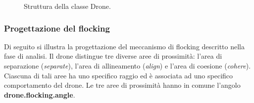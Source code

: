 \begin{figure}[H] 
    \captionsetup{justification=centering, margin=2cm, font=footnotesize}
    \begin{center}
    \end{center}
    \caption{Struttura della classe Drone.}
    \label{classe_drone}
\end{figure}

\subsubsection{Progettazione del flocking}

Di seguito si illustra la progettazione del meccanismo di flocking descritto nella fase di analisi. 
Il drone distingue tre diverse aree di prossimità: l’area di separazione (\textit{separate}), l’area di allineamento (\textit{align}) e l’area di coesione (\textit{cohere}). 
Ciascuna di tali aree ha uno specifico raggio ed è associata ad uno specifico comportamento del drone.
Le tre aree di prossimità hanno in comune l’angolo \textbf{drone.flocking.angle}.

